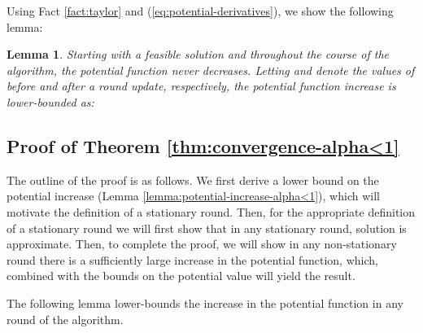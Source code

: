 \documentclass[11pt]{article}
\newtheorem{lemma}[theorem]{Lemma}
\newif\iffullpaper
\begin{document}
Using Fact \ref{fact:taylor} and (\ref{eq:potential-derivatives}), we show the following lemma:

\begin{lemma}\label{lemma:potential-increase}
Starting with a feasible solution and throughout the course of the algorithm, the potential function  never decreases. Letting  and  denote the values of  before and after a round update, respectively, the potential function increase is lower-bounded as:

\end{lemma}
\iffullpaper
\begin{proof}
Since  is concave, using Fact \ref{fact:taylor} and (\ref{eq:potential-derivatives}) it follows that:

If , then the term in the summation (\ref{eq:potential-increase-before-bounds}) corresponding to the change in  is equal to zero, and  has no contribution to the sum in (\ref{eq:potential-increase-before-bounds}). 

If , then, as  increases over the observed round, it must be . By the choice of the parameters, , and therefore

It follows that , and therefore 


Finally, if , then it must be . By the choice of the parameters, , implying

We get that , and therefore 

completing the proof.
\end{proof}
\fi

\iffullpaper
\subsection{Proof of Theorem \ref{thm:convergence-alpha<1}}\label{section:alpha<1}

The outline of the proof is as follows. We first derive a lower bound on the potential increase (Lemma \ref{lemma:potential-increase-alpha<1}), which will motivate the definition of a stationary round. Then, for the appropriate definition of a stationary round we will first show that in any stationary round, solution is approximate. Then, to complete the proof, we will show in any non-stationary round there is a sufficiently large increase in the potential function, which, combined with the bounds on the potential value will yield the result.

The following lemma lower-bounds the increase in the potential function in any round of the algorithm. 
\end{document}
